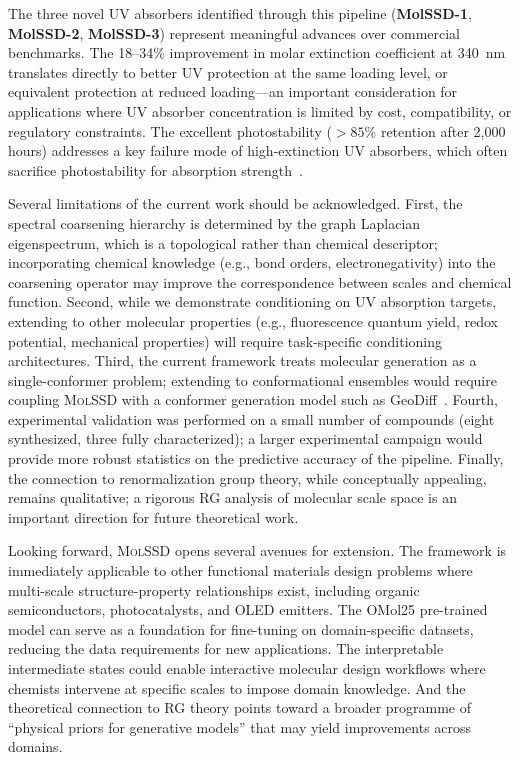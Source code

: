 \documentclass[11pt]{article}
\newcommand{\molssd}{\textsc{MolSSD}}
\begin{document}
The three novel UV absorbers identified through this pipeline (\textbf{MolSSD-1}, \textbf{MolSSD-2}, \textbf{MolSSD-3}) represent meaningful advances over commercial benchmarks. The 18--34\% improvement in molar extinction coefficient at 340~nm translates directly to better UV protection at the same loading level, or equivalent protection at reduced loading---an important consideration for applications where UV absorber concentration is limited by cost, compatibility, or regulatory constraints. The excellent photostability (${>}85\%$ retention after 2{,}000 hours) addresses a key failure mode of high-extinction UV absorbers, which often sacrifice photostability for absorption strength~\cite{cantrell2012uv}.

Several limitations of the current work should be acknowledged. First, the spectral coarsening hierarchy is determined by the graph Laplacian eigenspectrum, which is a topological rather than chemical descriptor; incorporating chemical knowledge (e.g., bond orders, electronegativity) into the coarsening operator may improve the correspondence between scales and chemical function. Second, while we demonstrate conditioning on UV absorption targets, extending to other molecular properties (e.g., fluorescence quantum yield, redox potential, mechanical properties) will require task-specific conditioning architectures. Third, the current framework treats molecular generation as a single-conformer problem; extending to conformational ensembles would require coupling \molssd{} with a conformer generation model such as GeoDiff~\cite{xu2023geodiff}. Fourth, experimental validation was performed on a small number of compounds (eight synthesized, three fully characterized); a larger experimental campaign would provide more robust statistics on the predictive accuracy of the pipeline. Finally, the connection to renormalization group theory, while conceptually appealing, remains qualitative; a rigorous RG analysis of molecular scale space is an important direction for future theoretical work.

Looking forward, \molssd{} opens several avenues for extension. The framework is immediately applicable to other functional materials design problems where multi-scale structure-property relationships exist, including organic semiconductors, photocatalysts, and OLED emitters. The OMol25 pre-trained model can serve as a foundation for fine-tuning on domain-specific datasets, reducing the data requirements for new applications. The interpretable intermediate states could enable interactive molecular design workflows where chemists intervene at specific scales to impose domain knowledge. And the theoretical connection to RG theory points toward a broader programme of ``physical priors for generative models'' that may yield improvements across domains.
\end{document}
